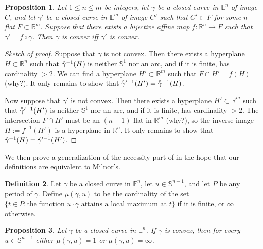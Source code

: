 \documentclass{amsart}
\newtheorem{proposition}{Proposition}[section]
\theoremstyle{definition}
\newtheorem{definition}[proposition]{Definition}
\theoremstyle{remark}
\newcommand{\lring}[1]{\accentset{\circ}{#1}}
\begin{document}
\begin{proposition}
    \label{pro:convex_preserved}
    Let $1\le n\le m$ be integers, let $\gamma$ be a closed curve
    in $\mathbb{E}^n$ of image $C$, and let $\gamma'$ be a closed curve
    in $\mathbb{E}^m$ of image $C'$ such that $C'\subset F$
    for some $n$-flat $F\subset\mathbb{R}^m$.
    Suppose that there exists a bijective affine map
    $f:\mathbb{R}^n\to F$ such that $\gamma'=f\circ\gamma$.
    Then $\gamma$ is convex iff $\gamma'$ is convex.
\end{proposition}

\begin{proof}[Sketch of proof]
    Suppose that $\gamma$ is not convex.
    Then there exists a hyperplane $H\subset\mathbb{R}^n$
    such that $\lring{\gamma}^{-1}(H)$ is neither $\mathbb{S}^1$
    nor an arc, and if it is finite, has cardinality $>2$.
    We can find a hyperplane $H'\subset\mathbb{R}^m$ such that
    $F\cap H'=f(H)$ (why?). It only remains to show that
    $\lring{\gamma}'^{-1}(H')=\lring{\gamma}^{-1}(H)$.

    Now suppose that $\gamma'$ is not convex.
    Then there exists a hyperplane $H'\subset\mathbb{R}^m$
    such that $\lring{\gamma}'^{-1}(H')$ is neither $\mathbb{S}^1$
    nor an arc, and if it is finite, has cardinality $>2$.
    The intersection $F\cap H'$ must be an $(n-1)$-flat
    in $\mathbb{R}^m$ (why?), so the inverse image
    $H:=f^{-1}(H')$ is a hyperplane in $\mathbb{R}^n$.
    It only remains to show that
    $\lring{\gamma}^{-1}(H)=\lring{\gamma}'^{-1}(H')$.
\end{proof}

We then prove a generalization of the necessity part
of \cite[Lemma 3.3]{milnor} in the hope that
our definitions are equivalent to Milnor's.

\begin{definition}
    Let $\gamma$ be a closed curve in $\mathbb{E}^n$,
    let $u\in\mathbb{S}^{n-1}$,
    and let $P$ be any period of $\gamma$.
    Define $\mu(\gamma,u)$ to be the cardinality of the set
    $\{t\in P:\text{the function }u\cdot\gamma
        \text{ attains a local maximum at }t\}$
    if it is finite, or $\infty$ otherwise.
\end{definition}

\begin{proposition}
    Let $\gamma$ be a closed curve in $\mathbb{E}^n$.
    If $\gamma$ is convex, then for every $u\in\mathbb{S}^{n-1}$
    either $\mu(\gamma,u)=1$ or $\mu(\gamma,u)=\infty$.
\end{proposition}
\end{document}
